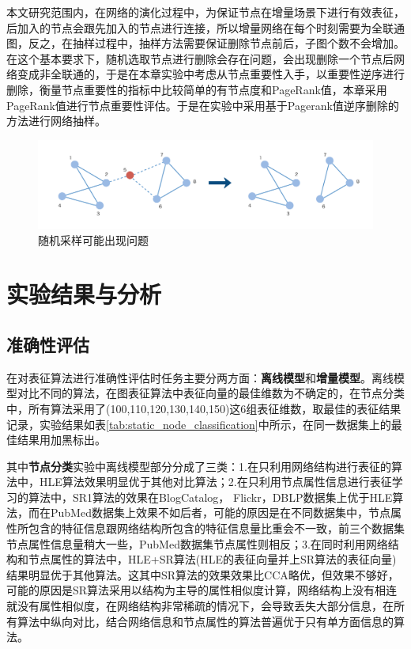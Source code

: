 本文研究范围内，在网络的演化过程中，为保证节点在增量场景下进行有效表征，后加入的节点会跟先加入的节点进行连接，所以增量网络在每个时刻需要为全联通图，反之，在抽样过程中，抽样方法需要保证删除节点前后，子图个数不会增加。在这个基本要求下，随机选取节点进行删除会存在问题，会出现删除一个节点后网络变成非全联通的，于是在本章实验中考虑从节点重要性入手，以重要性逆序进行删除，衡量节点重要性的指标中比较简单的有节点度和PageRank值\cite{page1999pagerank}，本章采用PageRank值进行节点重要性评估。于是在实验中采用基于Pagerank值逆序删除的方法进行网络抽样。
\begin{figure}
	\centering
	\includegraphics[width=6.2in]{figures/sample_split}
	\caption{随机采样可能出现问题}
\end{figure}


\section{实验结果与分析}
\subsection{准确性评估}
在对表征算法进行准确性评估时任务主要分两方面：\textbf{离线模型}和\textbf{增量模型}。离线模型对比不同的算法，在图表征算法中表征向量的最佳维数为不确定的，在节点分类中，所有算法采用了(100,110,120,130,140,150)这6组表征维数，取最佳的表征结果记录，实验结果如表\ref{tab:static_node_classification}中所示，在同一数据集上的最佳结果用加黑标出。

其中\textbf{节点分类}实验中离线模型部分分成了三类：1.在只利用网络结构进行表征的算法中，HLE算法效果明显优于其他对比算法；2.在只利用节点属性信息进行表征学习的算法中，SR1算法的效果在BlogCatalog， Flickr，DBLP数据集上优于HLE算法，而在PubMed数据集上效果不如后者，可能的原因是在不同数据集中，节点属性所包含的特征信息跟网络结构所包含的特征信息量比重会不一致，前三个数据集节点属性信息量稍大一些，PubMed数据集节点属性则相反；3.在同时利用网络结构和节点属性的算法中，HLE+SR算法(HLE的表征向量并上SR算法的表征向量)结果明显优于其他算法。这其中SR算法的效果效果比CCA略优，但效果不够好，可能的原因是SR算法采用以结构为主导的属性相似度计算，网络结构上没有相连就没有属性相似度，在网络结构非常稀疏的情况下，会导致丢失大部分信息，在所有算法中纵向对比，结合网络信息和节点属性的算法普遍优于只有单方面信息的算法。

